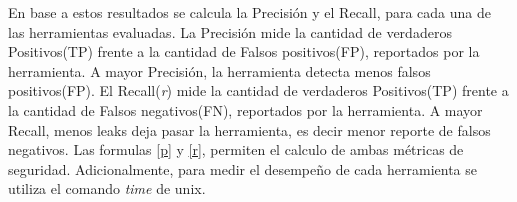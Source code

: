 En base a estos resultados se calcula la Precisión y el Recall, para cada una de
las herramientas evaluadas. La Precisión mide la cantidad de verdaderos
Positivos(TP) frente a la cantidad de Falsos positivos(FP), reportados por la
herramienta. A mayor Precisión, la herramienta detecta menos falsos
positivos(FP).\newline 
El Recall(\textit{r}) mide la cantidad de verdaderos Positivos(TP) frente a la
cantidad de Falsos negativos(FN), reportados por la herramienta. A mayor Recall,
menos leaks deja pasar la herramienta, es decir menor reporte de falsos
negativos. Las formulas \ref{p} y \ref{r}, permiten el calculo de ambas métricas
de seguridad.\newline
Adicionalmente, para medir el desempeño de cada herramienta se utiliza el
comando \textit{time}\cite{time-man} de unix. 

